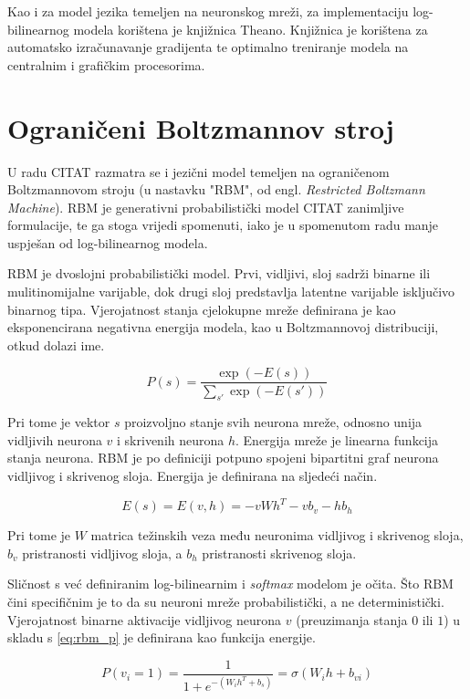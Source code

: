\documentclass[times, utf8, diplomski, numeric]{fer}
\begin{document}
Kao i za model jezika temeljen na neuronskog mreži, za implementaciju log-bilinearnog modela korištena je knjižnica Theano. Knjižnica je korištena za automatsko izračunavanje gradijenta te optimalno treniranje modela na centralnim i grafičkim procesorima.

\chapter{Ograničeni Boltzmannov stroj}

U radu CITAT razmatra se i jezični model temeljen na ograničenom Boltzmannovom stroju (u nastavku "RBM", od engl. \textit{Restricted Boltzmann Machine}). RBM je generativni probabilistički model CITAT zanimljive formulacije, te ga stoga vrijedi spomenuti, iako je u spomenutom radu manje uspješan od log-bilinearnog modela.

RBM je dvoslojni probabilistički model. Prvi, vidljivi, sloj sadrži binarne ili mulitinomijalne varijable, dok drugi sloj predstavlja latentne varijable isključivo binarnog tipa. Vjerojatnost stanja cjelokupne mreže definirana je kao eksponencirana negativna energija modela, kao u Boltzmannovoj distribuciji, otkud dolazi ime.

\begin{equation}
\label{eq:rbm_p}
P(s) = \frac{\exp(-E(s))}{\sum_{s'}\exp(-E(s'))}
\end{equation}

Pri tome je vektor $s$ proizvoljno stanje svih neurona mreže, odnosno unija vidljivih neurona $v$ i skrivenih neurona $h$. Energija mreže je linearna funkcija stanja neurona. RBM je po definiciji potpuno spojeni bipartitni graf neurona vidljivog i skrivenog sloja. Energija je definirana na sljedeći način.

\[
E(s) = E(v, h) = - v W h^T  - v b_v - h b_h
\]

Pri tome je $W$ matrica težinskih veza među neuronima vidljivog i skrivenog sloja, $b_v$ pristranosti vidljivog sloja, a $b_h$ pristranosti skrivenog sloja.

Sličnost s već definiranim log-bilinearnim i \textit{softmax} modelom je očita. Što RBM čini specifičnim je to da su neuroni mreže probabilistički, a ne deterministički. Vjerojatnost binarne aktivacije vidljivog neurona $v$ (preuzimanja stanja $0$ ili $1$) u skladu s \ref{eq:rbm_p} je definirana kao funkcija energije.

\[
 P(v_i = 1) = \frac{1}{ 1 + e^{- ( W_i h^T + b_s)}} = \sigma( W_i h + b_{vi})
\]
\end{document}

